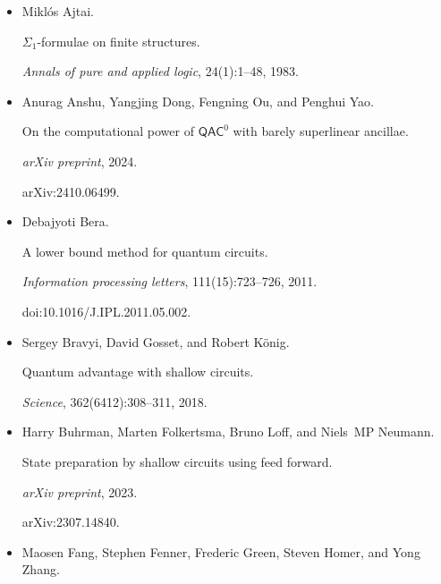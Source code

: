 \documentclass[10pt,a4paper]{article}
\begin{document}
\begin{itemize}


\item[] 
[1]

Miklós Ajtai.


$\Sigma_{1}$-formulae on finite structures.


\emph{Annals of pure and applied logic}, 24(1):1–48, 1983.





\item[] 
[2]

Anurag Anshu, Yangjing Dong, Fengning Ou, and Penghui Yao.


On the computational power of ${\mathsf{QAC}}^{0}$ with barely superlinear
ancillae.


\emph{arXiv preprint}, 2024.


arXiv:2410.06499.





\item[] 
[3]

Debajyoti Bera.


A lower bound method for quantum circuits.


\emph{Information processing letters}, 111(15):723–726, 2011.


doi:10.1016/J.IPL.2011.05.002.





\item[] 
[4]

Sergey Bravyi, David Gosset, and Robert König.


Quantum advantage with shallow circuits.


\emph{Science}, 362(6412):308–311, 2018.





\item[] 
[5]

Harry Buhrman, Marten Folkertsma, Bruno Loff, and Niels MP Neumann.


State preparation by shallow circuits using feed forward.


\emph{arXiv preprint}, 2023.


arXiv:2307.14840.





\item[] 
[6]

Maosen Fang, Stephen Fenner, Frederic Green, Steven Homer, and Yong Zhang.



\end{itemize}
\end{document}

